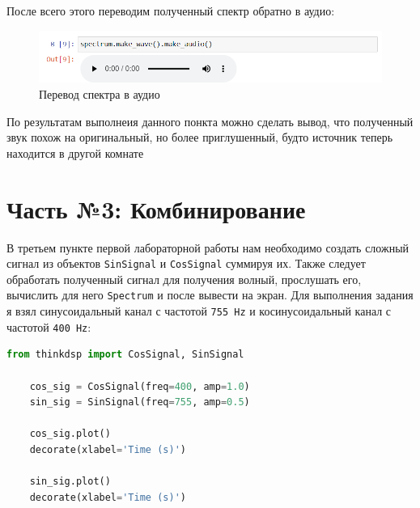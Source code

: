 \documentclass[a4paper]{article}
\begin{document}
            После всего этого переводим полученный спектр обратно в аудио:
            
            \begin{figure}[H]
                \centering
                \includegraphics[width=\textwidth]{translate.png}
                \caption{Перевод спектра в аудио}
                \label{fig:spectr_translate}
            \end{figure}
            
            По результатам выполнеия данного понкта можно сделать вывод, что полученный звук похож на оригинальный, но более приглушенный, будто источник теперь находится в другой комнате
            
    \newpage
        \section{Часть №3: Комбинирование}
            В третьем пункте первой лабораторной работы нам необходимо создать сложный сигнал из объектов \texttt{SinSignal} и \texttt{CosSignal} суммируя их. Также следует обработать полученный сигнал для получения волный, прослушать его, вычислить для него  \texttt{Spectrum} и после вывести на экран.
            Для выполнения задания я взял синусоидальный канал с частотой \texttt{755 Hz} и косинусоидальный канал с частотой \texttt{400 Hz}:
            
\begin{lstlisting}[language=Python, caption= Создание каналов]
    from thinkdsp import CosSignal, SinSignal

    cos_sig = CosSignal(freq=400, amp=1.0)
    sin_sig = SinSignal(freq=755, amp=0.5)

    cos_sig.plot()
    decorate(xlabel='Time (s)')

    sin_sig.plot()
    decorate(xlabel='Time (s)')
\end{lstlisting}
            
\end{document}
